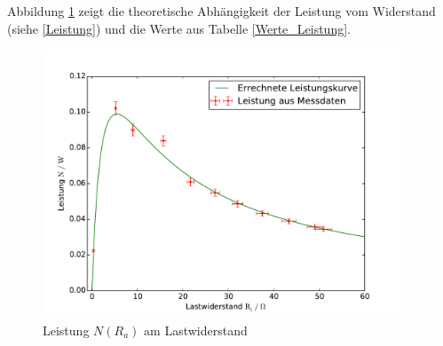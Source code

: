 Abbildung \ref{fig:Werte_Leistung} zeigt die theoretische Abhängigkeit der Leistung vom Widerstand (siehe \eqref{Leistung}) und die Werte aus Tabelle \ref{Werte_Leistung}.

\begin{figure}[h!]
	\centering
	\includegraphics[width=0.95\textwidth]{Leistungskurve.pdf}
	\caption{Leistung $N(R_a)$ am Lastwiderstand}
	\label{fig:Werte_Leistung}
\end{figure}



